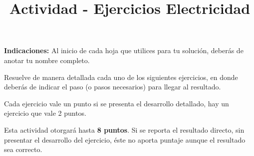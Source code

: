 \documentclass[14pt]{extarticle}
\title{\vspace*{-2cm} Actividad - Ejercicios Electricidad \vspace{-5ex}}
\date{}
\begin{document}
\maketitle

\textbf{Indicaciones:} Al inicio de cada hoja que utilices para tu solución, deberás de anotar tu nombre completo.
\par
Resuelve de manera detallada cada uno de los siguientes ejercicios, en donde deberás de indicar el paso (o pasos necesarios) para llegar al resultado.
\par
Cada ejercicio vale un punto si se presenta el desarrollo detallado, hay un ejercicio que vale 2 puntos.
\par
Esta actividad otorgará hasta \textbf{8 puntos}. Si se reporta el resultado directo, sin presentar el desarrollo del ejercicio, éste no aporta puntaje aunque el resultado sea correcto.
\end{document}
